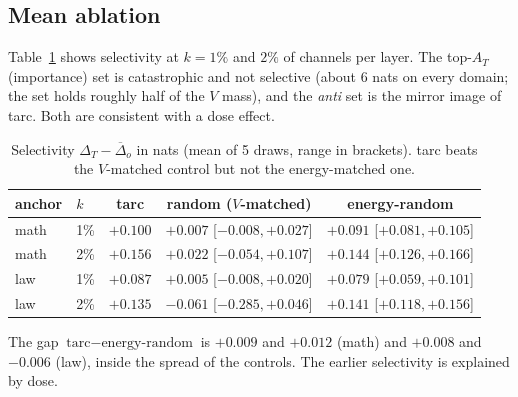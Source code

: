 \documentclass[11pt]{article}
\begin{document}
\subsection{Mean ablation}
Table~\ref{tab:ablation} shows selectivity at $k=1\%$ and $2\%$ of channels per layer. The top-$A_T$ (importance) set is catastrophic and not selective (about $6$ nats on every domain; the set holds roughly half of the $V$ mass), and the \emph{anti} set is the mirror image of tarc. Both are consistent with a dose effect.
\begin{table}[h]
\centering\small
\begin{tabular}{llccc}
\toprule
anchor & $k$ & tarc & random ($V$-matched) & energy-random\\
\midrule
math & 1\% & $+0.100$ & $+0.007$ [$-0.008,+0.027$] & $+0.091$ [$+0.081,+0.105$]\\
math & 2\% & $+0.156$ & $+0.022$ [$-0.054,+0.107$] & $+0.144$ [$+0.126,+0.166$]\\
law  & 1\% & $+0.087$ & $+0.005$ [$-0.008,+0.020$] & $+0.079$ [$+0.059,+0.101$]\\
law  & 2\% & $+0.135$ & $-0.061$ [$-0.285,+0.046$] & $+0.141$ [$+0.118,+0.156$]\\
\bottomrule
\end{tabular}
\caption{Selectivity $\Delta_T-\overline{\Delta}_o$ in nats (mean of 5 draws, range in brackets). tarc beats the $V$-matched control but not the energy-matched one.}
\label{tab:ablation}
\end{table}
The gap $\text{tarc}-\text{energy-random}$ is $+0.009$ and $+0.012$ (math) and $+0.008$ and $-0.006$ (law), inside the spread of the controls. The earlier selectivity is explained by dose.
\end{document}
